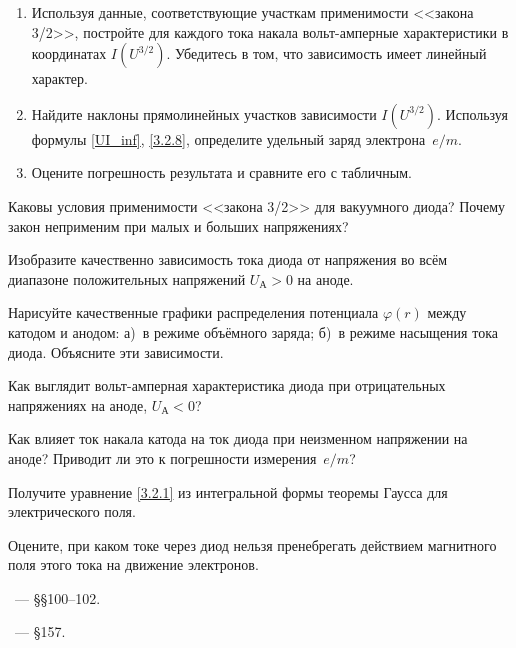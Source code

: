 \begin{lab:task}
\begin{enumerate}
\item Используя данные, соответствующие участкам применимости
<<закона 3/2>>, постройте для каждого тока накала вольт-амперные 
характеристики в координатах $I(U^{3/2})$. 
Убедитесь в том, что зависимость имеет линейный характер. 

\item Найдите наклоны прямолинейных участков зависимости
$I(U^{3/2})$. Используя формулы \eqref{UI_inf}, \eqref{3.2.8}, 
определите удельный заряд электрона~$e/m$.

\item Оцените погрешность результата и сравните его с табличным.

\end{enumerate}

\end{lab:task}

\begin{lab:questions}
    
    \item Каковы условия применимости <<закона 3/2>> для вакуумного диода?
    Почему закон неприменим при малых и больших напряжениях?
    
    \item Изобразите качественно зависимость тока диода от напряжения
    во всём диапазоне положительных напряжений $U_{А}>0$ на аноде.
    
	\item Нарисуйте качественные графики распределения потенциала $\varphi(r)$ 
    между катодом и анодом: а)~в режиме объёмного заряда;
б)~в режиме насыщения тока диода. Объясните эти зависимости.

    \item Как выглядит вольт-амперная характеристика диода при отрицательных
    напряжениях на аноде, $U_{А}<0$?

	\item Как влияет ток накала катода на ток диода при неизменном напряжении
на аноде? Приводит ли это к погрешности измерения~$e/m$?

    \item Получите уравнение \eqref{3.2.1} из интегральной формы теоремы Гаусса
    для электрического поля.
    
    \item Оцените, при каком токе через диод нельзя пренебрегать
    действием магнитного поля этого тока на движение электронов.

\end{lab:questions}

\begin{lab:literature}
	\item \SivuhinIII~--- \S\S100--102.
	\item \Kalashnikov~--- \S157.
\end{lab:literature}

